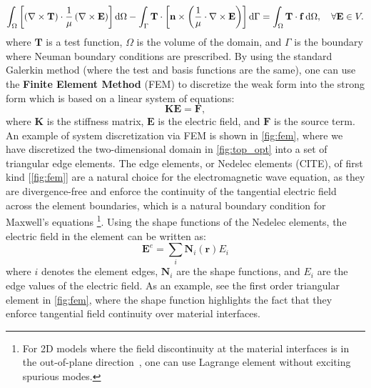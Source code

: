     \begin{equation}
        \int_\Omega \left[ \left( \nabla \times \mathbf{T} \right) \cdot \frac{1}{\mu} \left( \nabla \times \mathbf{E} \right) \right] \mathop{}\!\text{d} \Omega 
        - \int_\Gamma \mathbf{T} \cdot \left[ \mathbf{n} \times \left( \frac{1}{\mu} \cdot \nabla \times \mathbf{E} \right) \right] \mathop{}\!\text{d} \Gamma \\
        = \int_\Omega \mathbf{T} \cdot \mathbf{f} \mathop{}\!\text{d} \Omega,
        \quad \forall \mathbf{E} \in V.
    \end{equation}
where $\mathbf{T}$ is a test function, $\Omega$ is the volume of the domain, and $\Gamma$ is the boundary where Neuman boundary conditions
are prescribed. By using  the standard Galerkin method (where the test and basis functions are the same), one can use the \textbf{Finite Element Method} 
(FEM) to discretize the weak form 
into the strong form which is based on a linear system of equations:
\begin{equation}\label{eq:discretized}
    \mathbf{K} \mathbf{E} = \mathbf{F},
\end{equation}
where $\mathbf{K}$ is the stiffness matrix, $\mathbf{E}$ is the electric field, and $\mathbf{F}$ is the source term. 
An example of system discretization via FEM is shown in \autoref{fig:fem},  where we have discretized the two-dimensional 
domain in \autoref{fig:top_opt} into a set of triangular edge elements. The edge elements, or Nedelec elements (CITE), 
of first kind [\autoref{fig:fem}] are a natural choice for the electromagnetic 
wave equation, as they are divergence-free and enforce the continuity of the tangential electric field 
across the element boundaries, which is a natural boundary condition for Maxwell's equations 
\footnote{For 2D models where the field discontinuity at the material interfaces 
is in the out-of-plane direction~\cite{ownpub3}, one can use Lagrange element without 
exciting spurious modes.}. Using the shape functions of the Nedelec elements, the electric field in the element can be written as:
\begin{equation}
    \boldsymbol{E}^e=\sum_i \boldsymbol{N}_i(\mathbf{r}) E_i
\end{equation}
where $i$ denotes the element edges, $\boldsymbol{N}_i$ are the shape functions, and $E_i$ are the edge values of the electric field. As an example,
see the first order triangular element in \autoref{fig:fem}, where the shape function highlights the fact that they enforce tangential field
continuity over material interfaces. 

